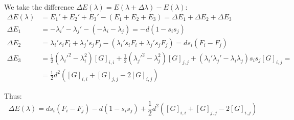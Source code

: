 We take the difference \(\Delta E (\lambda)=E(\lambda+\Delta \lambda)-E(\lambda)\):
\begin{align*}
    \Delta E(\lambda )
    &= E_1'+E_2'+E_3'-\left( E_1+E_2+E_3 \right) 
    =\Delta E_1 + \Delta E_2 +\Delta E_3
    \\
    \Delta E_1&= -\lambda _i'-\lambda _j' - (-\lambda _i-\lambda _j)=-d(1-s_is_j)\\
    \Delta E_2&= \lambda _i's_i F_i + \lambda _j's_jF_j - (\lambda _i's_i F_i + \lambda _j's_jF_j) = d s_i (F_i - F_j)\\
    \Delta E_3&= 
    \frac{1}{2}(\lambda _i'^2-\lambda _i^2)[G]_{i,i}+
    \frac{1}{2}(\lambda _j'^2-\lambda _j^2)[G]_{j,j}+
    (\lambda_i'\lambda_j'-\lambda _i \lambda _j)s_is_j[G]_{i,j}=\\
    &=\frac{1}{2} d^2 ([G]_{i,i} + [G]_{j,j} - 2 [G]_{i,j})
\end{align*}

Thus:
\begin{equation*}
    \Delta E(\lambda)=
    ds_i(F_i-F_j)-d(1-s_is_j)+\frac{1}{2} d^2 \left([G]_{i,i} + [G]_{j,j} - 2 [G]_{i,j}\right)
\end{equation*}








